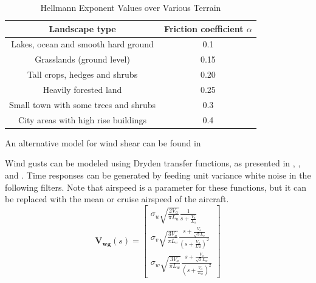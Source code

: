 \begin{table}[H]
\centering
\begin{tabular}{|c|c|}
	\hline
	           Landscape type             & Friction coefficient $\alpha$ \\ \hline
	 Lakes, ocean and smooth hard ground  &              0.1              \\ \hline
	      Grasslands (ground level)       &             0.15              \\ \hline
	    Tall crops, hedges and shrubs     &             0.20              \\ \hline
	        Heavily forested land         &             0.25              \\ \hline
	Small town with some trees and shrubs &              0.3              \\ \hline
	 City areas with high rise buildings  &              0.4              \\ \hline
\end{tabular} 
\caption{Hellmann Exponent Values over Various Terrain}
\end{table}

An alternative model for wind shear can be found in \cite{Moorhouse1982}

Wind gusts can be modeled using Dryden transfer functions, as presented in \cite{Moorhouse1982}, \cite{BEAL1993}, \cite{MathWorks:DrydenTurbulence} and \cite{Beard2012} . Time responses can be generated by feeding unit variance white noise in the following filters. Note that airspeed is a parameter for these functions, but it can be replaced with the mean or cruise airspeed of the aircraft.
\begin{equation}
	\bm{V_{wg}}(s) =
	\begin{bmatrix}
		\sigma_u \sqrt{\frac{2V_a}{\pi L_u}} \frac{1}{s + \frac{V_a}{L_u}}\\
		\sigma_v \sqrt{\frac{3V_a}{\pi L_v}} \frac{s+\frac{V_a}{\sqrt{3}L_v}}{(s+\frac{V_a}{Lu})^2} \\
		\sigma_w \sqrt{\frac{3V_a}{\pi L_w}} \frac{s+\frac{V_a}{\sqrt{3}L_w}}{(s+\frac{V_a}{L_w})^2}
	\end{bmatrix}
\end{equation}


